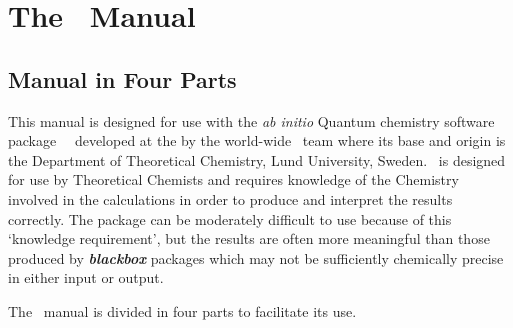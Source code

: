 
\section{The \molcas\ Manual}
\label{sec:about_this_manual}

\subsection{Manual in Four Parts}
\label{sec:who_should_read}

This manual is designed for use with the {\it ab initio} Quantum
chemistry software package \molcas\ \molcasversion\ developed at the
by the world-wide \molcas\ team where its base and origin is the
Department of Theoretical Chemistry, Lund University, Sweden.  \molcas\ is designed for use
by Theoretical Chemists and requires knowledge of the
Chemistry involved in the calculations in order to produce and
interpret the results correctly.  The package can be moderately difficult to use
because of this `knowledge requirement', but the results are often more
meaningful than those produced by \textbf{\textit{blackbox}} packages which may not be
sufficiently chemically precise in either input or output.

The \molcas\ manual is divided in four parts to facilitate its use.

